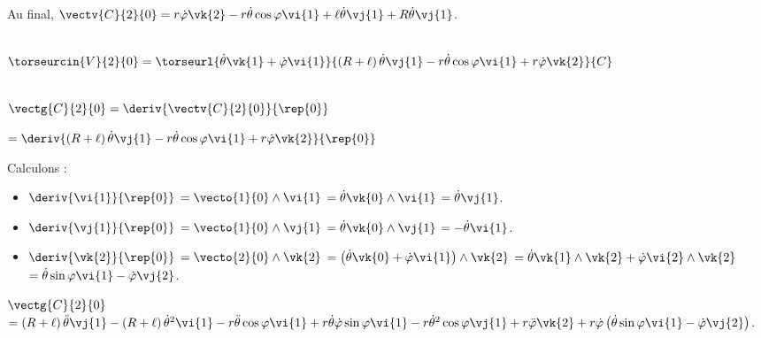 Au final, 
 $\vectv{C}{2}{0}=r\dot{\varphi}\vk{2}-r\dot{\theta}\cos\varphi\vi{1}+\ell\dot{\theta}\vj{1}+R\dot{\theta}\vj{1}$.
\else
\fi


\ifprof ~\\
$\torseurcin{V}{2}{0} = \torseurl{\dot{\theta}\vk{1}+ \dot{\varphi}\vi{1}}{\left(R+\ell\right)\dot{\theta}\vj{1} -r\dot{\theta}\cos\varphi \vi{1} + r\dot{\varphi}\vk{2}}{C}$
\else
\fi

\ifprof ~\\
 
 $\vectg{C}{2}{0} = \deriv{\vectv{C}{2}{0}}{\rep{0}}$
 
 $ = \deriv{\left(R+\ell\right)\dot{\theta}\vj{1} -r\dot{\theta}\cos\varphi \vi{1} + r\dot{\varphi}\vk{2}}{\rep{0}}$
 
 Calculons : 
\begin{itemize}
\item $\deriv{\vi{1}}{\rep{0}}$ $=\vecto{1}{0} \wedge \vi{1}$ $=\dot{\theta}\vk{0} \wedge \vi{1}$ $=\dot{\theta}\vj{1}$.
\item $\deriv{\vj{1}}{\rep{0}}$ $=\vecto{1}{0} \wedge \vj{1}$ $=\dot{\theta}\vk{0} \wedge \vj{1}$ $=-\dot{\theta}\vi{1}$.
\item $\deriv{\vk{2}}{\rep{0}}$ $=\vecto{2}{0} \wedge \vk{2}$ 
$=\left(\dot{\theta}\vk{0}+ \dot{\varphi}\vi{1} \right) \wedge \vk{2}$
$=\dot{\theta}\vk{1} \wedge \vk{2}+ \dot{\varphi}\vi{2}  \wedge \vk{2}$
$=\dot{\theta}\sin\varphi\vi{1}- \dot{\varphi}\vj{2}$.
\end{itemize}

$\vectg{C}{2}{0}$ 
$ =\left(R+\ell\right)\ddot{\theta}\vj{1} -\left(R+\ell\right)\dot{\theta}^2\vi{1} 
-r\ddot{\theta}\cos\varphi \vi{1} +r\dot{\theta}\dot{\varphi}\sin\varphi \vi{1} -r\dot{\theta}^2\cos\varphi \vj{1} 
+ r\ddot{\varphi}\vk{2}+ r\dot{\varphi}\left(\dot{\theta}\sin\varphi\vi{1}- \dot{\varphi}\vj{2} \right)$.
\else
\fi


